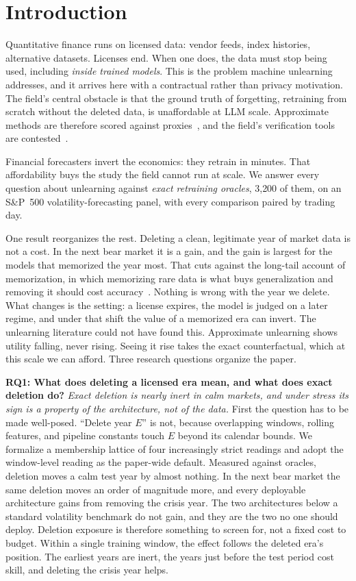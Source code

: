\section{Introduction}\label{sec:intro}

Quantitative finance runs on licensed data: vendor feeds, index
histories, alternative datasets. Licenses end. When one does, the
data must stop being used, including \emph{inside trained models}.
This is the problem machine unlearning addresses, and it arrives
here with a contractual rather than privacy motivation. The field's central obstacle is that
the ground truth of forgetting, retraining from scratch without the
deleted data, is unaffordable at LLM scale. Approximate methods are
therefore scored against
proxies~\cite{nguyen2025survey}, and the field's
verification tools are contested~\cite{zhang2024mia_cannot}.

Financial forecasters invert the economics: they retrain in minutes.
That affordability buys the study the field cannot run at scale. We
answer every question about unlearning against \emph{exact retraining
oracles}, 3{,}200 of them, on an S\&P~500 volatility-forecasting
panel, with every comparison paired by trading day.

One result reorganizes the rest. Deleting a clean, legitimate year of
market data is not a cost. In the next bear market it is a gain, and
the gain is largest for the models that memorized the year most. That
cuts against the long-tail account of memorization, in which
memorizing rare data is what buys generalization and removing it
should cost accuracy~\cite{feldman2020memorization}. Nothing is
wrong with the year we delete. What changes is the setting: a license
expires, the model is judged on a later regime, and under that shift
the value of a memorized era can invert. The unlearning literature
could not have found this. Approximate unlearning shows utility
falling, never rising. Seeing it rise takes the exact counterfactual,
which at this scale we can afford. Three research questions organize
the paper.

\textbf{RQ1: What does deleting a licensed era mean, and what does
exact deletion do?} \emph{Exact deletion is nearly inert in calm
markets, and under stress its sign is a property of the architecture,
not of the data.} First the question has to be made well-posed.
``Delete year $E$'' is not, because overlapping windows, rolling
features, and pipeline constants touch $E$ beyond its calendar
bounds. We formalize a membership lattice of four increasingly
strict readings and adopt the window-level reading as the
paper-wide default. Measured against oracles, deletion moves a calm
test year by almost nothing. In the next bear market the same
deletion moves an order of magnitude more, and every deployable
architecture gains from removing the crisis year. The two
architectures below a standard volatility benchmark do not gain,
and they are the two no one should deploy. Deletion exposure is
therefore something to screen for, not a fixed cost to budget.
Within a single training window, the effect follows the deleted
era's position. The earliest years are inert, the years just before
the test period cost skill, and deleting the crisis year helps.

